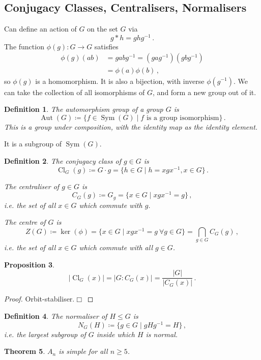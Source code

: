 \documentclass{article}
\theoremstyle{plain}\theoremheaderfont{\normalfont\itshape}\theorembodyfont{\rmfamily}\theoremseparator{.}\newtheorem*{rem}{Remark}\newtheorem*{ex}{Example}\newtheorem*{proof}{Proof}\newtheorem*{altp}{Alternative proof}\newtheorem*{nonex}{Non-Example}
\theoremstyle{plain}\theoremheaderfont{\normalfont\bfseries}\theorembodyfont{\rmfamily}\theoremseparator{.}\newtheorem{thm}{Theorem}[section]\newtheorem{lem}[thm]{Lemma}\newtheorem{prop}[thm]{Proposition}\newtheorem*{cor}{Corollary}\newtheorem{defn}[thm]{Definition}\newtheorem{clm}[thm]{Claim}\newtheorem{clminproof}{Claim}\newtheorem*{notn}{Notation}\newtheorem*{exer}{Exercise}\newtheorem*{lemnn}{Lemma}
\theoremstyle{break}\theoremheaderfont{\normalfont\itshape}\theorembodyfont{\rmfamily}\theoremseparator{.\medskip}\newtheorem*{proofskip}{Proof}\newtheorem*{exs}{Examples}\newtheorem*{rems}{Remarks}\newtheorem*{obs}{Observations}
\theoremstyle{break}\theoremheaderfont{\normalfont\bfseries}\theorembodyfont{\rmfamily}\theoremseparator{.\medskip}\newtheorem{lemskip}[thm]{Lemma}\newtheorem{defnskip}[thm]{Definition}\newtheorem{propskip}[thm]{Proposition}\newtheorem{thmskip}[thm]{Theorem}
\numberwithin{equation}{section}
\newcommand{\qed}{\hfill\ensuremath{\Box}}
\newcommand{\abs}[1]{\left|#1\right|}
\DeclareMathOperator*{\Sym}{Sym}
\DeclareMathOperator*{\Aut}{Aut}
\DeclareMathOperator{\Cl}{Cl}
\begin{document}
    \subsection{Conjugacy Classes, Centralisers, Normalisers}
    Can define an action of \(G\) on the set \(G\) via
    \[g*h=ghg^{-1}\,.\]
    The function \(\phi(g):G\to G\) satisfies
    \begin{align*}
        \phi(g)(ab)&=gabg^{-1}=(gag^{-1})(gbg^{-1})\\
        &=\phi(a)\phi(b)\,,
    \end{align*}
    so \(\phi(g)\) is a homomorphism. It is also a bijection, with inverse \(\phi(g^{-1})\). We can take the collection of all isomorphisms of \(G\), and form a new group out of it.
    \begin{defn}
        The \textit{automorphism group} of a group \(G\) is
        \[\Aut(G)\coloneqq\{f\in\Sym(G)\mid f\text{ is a group isomorphism}\}\,.\]
        This is a group under composition, with the identity map as the identity element.
    \end{defn}
    It is a subgroup of \(\Sym(G)\).
    \begin{defn}
        The \textit{conjugacy class} of \(g\in G\) is
        \[\Cl_G(g)\coloneqq G\cdot g=\{h\in G\mid h=xgx^{-1}, x\in G\}\,.\]

        The \textit{centraliser} of \(g\in G\) is
        \[C_G(g)\coloneqq G_g=\{x\in G\mid xgx^{-1}=g\}\,,\]
        i.e. the set of all \(x\in G\) which commute with \(g\).

        The \textit{centre} of \(G\) is
        \[Z(G)\coloneqq\ker(\phi)=\{x\in G\mid xgx^{-1}=g\ \forall g\in G\}=\bigcap_{g\in G}C_G(g)\,,\]
        i.e. the set of all \(x\in G\) which commute with all \(g\in G\).
    \end{defn}
    \begin{prop}
        \[\abs{\Cl_G(x)}=\abs{G:C_G(x)}=\frac{\abs{G}}{\abs{C_G(x)}}\,.\]
    \end{prop}
    \begin{proof}
        Orbit-stabiliser.\qed
    \end{proof}
    \begin{defn}
        The \textit{normaliser} of \(H\le G\) is
        \[N_G(H)\coloneqq\{g\in G\mid gHg^{-1}=H\}\,,\]
        i.e. the largest subgroup of \(G\) inside which \(H\) is normal.
    \end{defn}
    \begin{thm}
        \(A_n\) is simple for all \(n\ge 5\).
    \end{thm}
\end{document}
